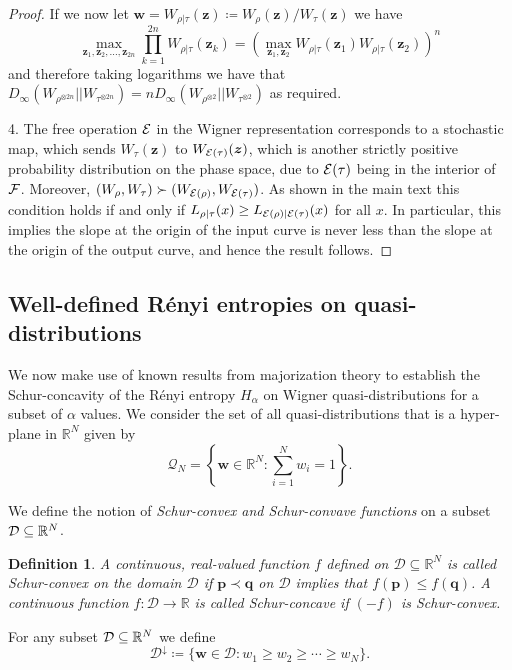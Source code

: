 \documentclass[
twocolumn,
superscriptaddress
]{revtex4-1}
\newtheorem{definition}[theorem]{Definition}
\def\z{\boldsymbol{z}}
\def\w{\boldsymbol{w}}
\def\p{\boldsymbol{p}}
\def\q{\boldsymbol{q}}
\def\q{\boldsymbol{q}}
\def\E{{\cal E}}
\def\D{{\cal D}}
\def\F{{\cal F}}
\begin{document}
\begin{proof}
If we now let $\w = W_{\rho|\tau}(\z) \coloneqq W_{\rho}(\z) /W_{\tau}(\z)$ we have
\begin{equation}
\max_{\z_1, \z_2, \dots ,\z_{2n}} \prod_{k=1}^{2n} W_{\rho|\tau}(\z_k) = \left( \max_{\z_1, \z_2} W_{\rho|\tau}(\z_1)W_{\rho|\tau}(\z_2) \right)^n
\end{equation}
and therefore taking logarithms we have that $D_\infty(W_{\rho^{\otimes 2n}} || W_{\tau^{\otimes 2n}}) = n D_\infty(W_{\rho^{\otimes 2}} || W_{\tau^{\otimes 2}})$ as required.

4. The free operation $\E$ in the Wigner representation corresponds to a stochastic map, which sends $W_\tau(\z)$ to $W_{\E(\tau)}(\z)$, which is another strictly positive probability distribution on the phase space, due to $\E(\tau)$ being in the interior of $\F$. Moreover, $(W_\rho, W_\tau ) \succ (W_{\E(\rho)} , W_{\E(\tau)})$. As shown in the main text this condition holds if and only if $L_{\rho|\tau}(x) \ge L_{\E(\rho)|\E(\tau)}(x)$ for all $x$. In particular, this implies the slope at the origin of the input curve is never less than the slope at the origin of the output curve, and hence the result follows.
\end{proof}

\subsection*{Well-defined R\'{e}nyi entropies on quasi-distributions}

We now make use of known results from majorization theory to establish the Schur-concavity of the R\'{e}nyi entropy $H_\alpha$ on Wigner quasi-distributions for a subset of $\alpha$ values. We consider the set of all quasi-distributions that is a hyper-plane in $\mathbb{R}^N$ given by
\begin{equation}
	\mathcal{Q}_N = \left\{ \w \in \mathbb{R}^N: \sum_{i=1}^N w_i = 1 \right\}.
\end{equation}

We define the notion of \emph{Schur-convex and Schur-convave functions} on a subset $\D \subseteq \mathbb{R}^N$.
\begin{definition} 
	A continuous, real-valued function $f$ defined on $\mathcal{D} \subseteq \mathbb{R}^N$ is called Schur-convex on the domain $\mathcal{D}$ if $\p \prec \q$ on $\mathcal{D}$ implies that $f(\p) \le f(\q)$. A continuous function $f:\mathcal{D} \rightarrow \mathbb{R}$ is called Schur-concave if $(-f)$ is Schur-convex.
\end{definition}
For any subset $\D \subseteq \mathbb{R}^N$ we define
\begin{equation}
	\mathcal{D}^\downarrow \coloneqq \{ \w \in \mathcal{D} : w_1 \ge w_2 \ge \cdots \ge w_N\}.
\end{equation}
\end{document}
